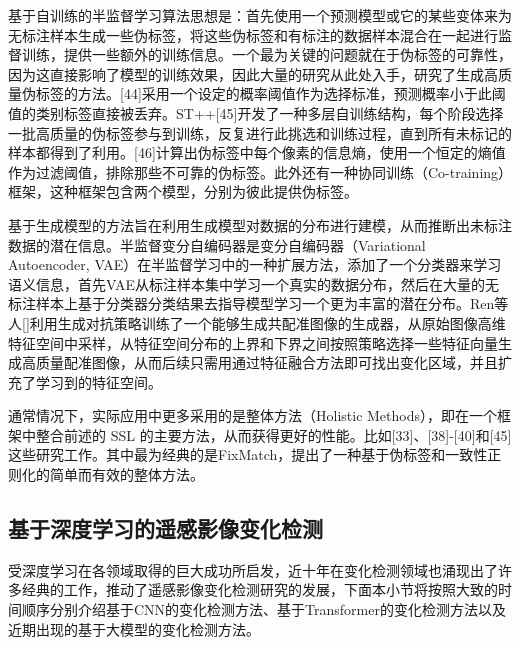 \documentclass[lang=chs, degree=master, blindreview=false, adobe=false]{yanputhesis}
\begin{document}
基于自训练的半监督学习算法思想是：首先使用一个预测模型或它的某些变体来为无标注样本生成一些伪标签，将这些伪标签和有标注的数据样本混合在一起进行监督训练，提供一些额外的训练信息。一个最为关键的问题就在于伪标签的可靠性，因为这直接影响了模型的训练效果，因此大量的研究从此处入手，研究了生成高质量伪标签的方法。[44]采用一个设定的概率阈值作为选择标准，预测概率小于此阈值的类别标签直接被丢弃。ST++[45]开发了一种多层自训练结构，每个阶段选择一批高质量的伪标签参与到训练，反复进行此挑选和训练过程，直到所有未标记的样本都得到了利用。[46]计算出伪标签中每个像素的信息熵，使用一个恒定的熵值作为过滤阈值，排除那些不可靠的伪标签。此外还有一种协同训练（Co-training）框架\cite{co-training}，这种框架包含两个模型，分别为彼此提供伪标签。

基于生成模型的方法旨在利用生成模型对数据的分布进行建模，从而推断出未标注数据的潜在信息。半监督变分自编码器\cite{semiVAE}是变分自编码器（Variational Autoencoder, VAE）在半监督学习中的一种扩展方法，添加了一个分类器来学习语义信息，首先VAE从标注样本集中学习一个真实的数据分布，然后在大量的无标注样本上基于分类器分类结果去指导模型学习一个更为丰富的潜在分布。Ren等人[]利用生成对抗策略训练了一个能够生成共配准图像的生成器，从原始图像高维特征空间中采样，从特征空间分布的上界和下界之间按照策略选择一些特征向量生成高质量配准图像，从而后续只需用通过特征融合方法即可找出变化区域，并且扩充了学习到的特征空间。

通常情况下，实际应用中更多采用的是整体方法（Holistic Methods），即在一个框架中整合前述的 SSL 的主要方法，从而获得更好的性能。比如[33]、[38]-[40]和[45]这些研究工作。其中最为经典的是FixMatch\cite{sohn2020fixmatch}，提出了一种基于伪标签和一致性正则化的简单而有效的整体方法。

\subsection{基于深度学习的遥感影像变化检测}
受深度学习在各领域取得的巨大成功所启发，近十年在变化检测领域也涌现出了许多经典的工作，推动了遥感影像变化检测研究的发展，下面本小节将按照大致的时间顺序分别介绍基于CNN的变化检测方法、基于Transformer的变化检测方法以及近期出现的基于大模型的变化检测方法。
\end{document}
